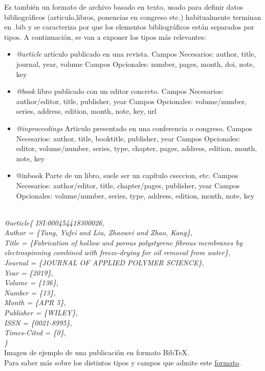 Es también un formato de archivo basado en texto, usado para definir datos bibliográficos (articulo,libros, ponencias en congreso etc.) habitualmente terminan en .bib y se caracteriza por que los elementos bibliográficos están separados por tipos. A continuación, se van a exponer los tipos más relevantes:
\begin{itemize}
	\item \emph{@article}
		artículo publicado en una revista.
		Campos Necesarios: author, title, journal, year, volume
		Campos Opcionales: number, pages, month, doi, note, key
	\item \emph{@book}
		libro publicado con un editor concreto.
		Campos Necesarios: author/editor, title, publisher, year
		Campos Opcionales: volume/number, series, address, edition, month, note, key, url
	\item \emph{@inproceedings}
		Articulo presentado en una conferencia o congreso.
		Campos Necesarios: author, title, booktitle, publisher, year
		Campos Opcionales: editor, volume/number, series, type, chapter, pages, address, edition, month, note, key
	\item @inbook
		Parte de un libro, suele ser un capítulo cseccion, etc.
		Campos Necesarios: author/editor, title, chapter/pages, publisher, year
		Campos Opcionales: volume/number, series, type, address, edition, month, note, key
		
	 
\end{itemize}

\emph{\\
@article\{ ISI:000454418300026,\\
Author = \{Tang, Yufei and Liu, Zhaowei and Zhao, Kang\},\\
Title = \{Fabrication of hollow and porous polystyrene fibrous membranes by\\
   electrospinning combined with freeze-drying for oil removal from water\},\\
Journal = \{JOURNAL OF APPLIED POLYMER SCIENCE\},\\
Year = \{2019\},\\
Volume = \{136\},\\
Number = \{13\},\\
Month = \{APR 5\},\\
Publisher = \{WILEY\},\\
ISSN = \{0021-8995\},\\
Times-Cited = \{0\},\\
\}}\\
Imagen de ejemplo de una publicación en formato BibTeX.\\
Para saber más sobre los distintos tipos y campos que admite este  \href{https://en.wikipedia.org/wiki/BibTeX}{formato}\cite{bibtexen}.

